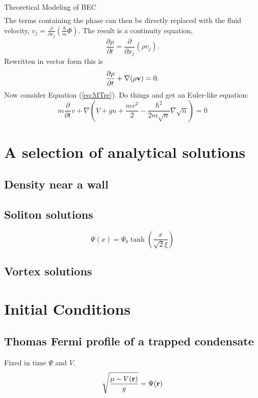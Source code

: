 \begin{chapter}{\label{cha:theoretical_model}Theoretical Modeling of BEC}
\begin{align*}
	\end{align*}
	The terms containing the phase can then be directly replaced with the fluid velocity, $v_j = \frac{\partial}{\partial x_j}\left( \frac{\hbar}{m} \Phi \right)$. The result is a continuity equation,
	\begin{equation*}
		\frac{\partial \rho}{\partial t} = \frac{\partial}{\partial x_j} \left( \rho v_j \right).
	\end{equation*}
	Rewritten in vector form this is
	\begin{equation}
		\frac{\partial \rho}{\partial t} + \nabla(\rho{\bf v}) = 0.
		\label{eq:MTcont}
	\end{equation}
	Now consider Equation (\ref{eq:MTre}). Do things and get an Euler-like equation:
	\begin{equation}
		m\frac{\partial}{\partial t} v + \nabla\left(V + gn + \frac{mv^2}{2} - \frac{\hbar^2}{2m\sqrt{n}}\nabla\sqrt{n}\right) = 0
		\label{eq:MTeuler}
	\end{equation}
\section{\label{section:solutions} A selection of analytical solutions}
	\subsection{\label{section:wall} Density near a wall}
	\subsection{\label{section:soliton} Soliton solutions}
		\begin{equation}
		\Psi(x) = \Psi_0 \tanh \left( \frac{x}{\sqrt{2}\xi} \right)
		\label{eq:soliton}
		\end{equation}
	\subsection{\label{section:vortices} Vortex solutions}
\section{\label{section:inital} Initial Conditions}
	\subsection{\label{section:tftrap} Thomas Fermi profile of a trapped condensate}
	Fixed in time $\Psi$ and $V$.
	\begin{equation}
	\sqrt{\frac{\mu - V({\bf r})}{g}} =  \Psi({\bf r})
	\label{eq:TF}
	\end{equation}

\end{chapter}
